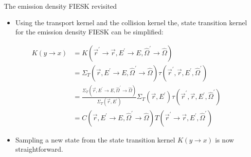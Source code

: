 \documentclass{beamer}
\begin{document}
\begin{frame}{The emission density FIESK revisited}

  \begin{itemize}
    \item Using the transport kernel and the collision kernel the, state
      transition kernel for the emission density FIESK can be simplified:
  \end{itemize}

  \begin{align}
    K(y \to x) & = K(\vec{r}^{'} \to \vec{r}, E^{'} \to E, 
    \hat{\Omega}^{'} \to \hat{\Omega}) \nonumber \\
    & = \Sigma_T(\vec{r},E^{'} \to E, \hat{\Omega}^{'} \to \hat{\Omega})
    \tau(\vec{r}^{'},\vec{r},E^{'},\hat{\Omega}^{'}) \nonumber \\
    & = \frac{\Sigma_T(\vec{r},E^{'} \to E, \hat{\Omega}^{'} \to \hat{\Omega})}
    {\Sigma_T(\vec{r},E^{'})} \Sigma_T(\vec{r},E^{'}) 
    \tau(\vec{r}^{'},\vec{r},E^{'},\hat{\Omega}^{'}) \nonumber \\
    & = C(\vec{r},E^{'} \to E,\hat{\Omega}^{'} \to \hat{\Omega})
    T(\vec{r}^{'} \to \vec{r},E^{'},\hat{\Omega}^{'}) \nonumber
  \end{align}

  \begin{itemize}
    \item Sampling a new state from the state transition kernel $K(y \to x)$
      is now straightforward.
  \end{itemize}

\end{frame}
\end{document}
